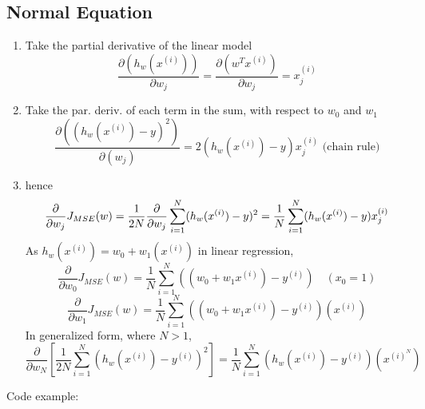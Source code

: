 \documentclass{article}
\begin{document}
\subsection{Normal Equation}
\begin{enumerate}
    \item Take the partial derivative of the linear model
    \begin{equation}
        \frac{\partial(h_w(x^{(i)}))}{\partial w_j} = \frac{\partial(w^Tx^{(i)})}{\partial w_j} = x_j^{(i)}    
    \end{equation}
    \item Take the par. deriv. of each term in the sum, with respect to $w_0$ and $w_1$
    \begin{equation}
        \frac{\partial((h_w(x^{(i)})-y)^2)}{\partial(w_j)} = 2 (h_w(x^{(i)}) - y) x_j^{(i)}  \text{     (chain rule)}
    \end{equation}
    \item hence
    \begin{equation}
        \frac{\partial}{\partial w_j} J_{MSE}(w) = \frac{1}{2N} \frac{\partial}{\partial w_j}\sum_{i=1}^{N}(h_w(x^{(i)})-y)^2 \\
        = \frac{1}{N} \sum_{i=1}^{N}(h_w(x^{(i)}) - y) x_j^{(i)}
    \end{equation}
    As \(h_w(x^{(i)}) = w_0 + w_1(x^{(i)})\) in linear regression,
    \[\frac{\partial }{\partial w_0} J_{MSE}(w)= \frac{1}{N} \sum_{i=1}^{N}((w_0 + w_1 x^{(i)}) - y^{(i)}) \quad {(x_0 = 1)}\]
    \[\frac{\partial }{\partial w_1} J_{MSE}(w)= \frac{1}{N} \sum_{i=1}^{N}((w_0 + w_1 x^{(i)}) - y^{(i)})(x^{(i)})\]
    In generalized form, where $N > 1$, 
    \[\frac{\partial }{\partial w_N} \left[ \frac{1}{2N} \sum_{i=1}^{N} \left(h_w(x^{(i)}) - y^{(i)}\right)^2 \right]= \frac{1}{N} \sum_{i=1}^{N}(h_w(x^{(i)}) - y^{(i)})(x^{(i)^N})\]
\end{enumerate}
Code example:
\end{document}
